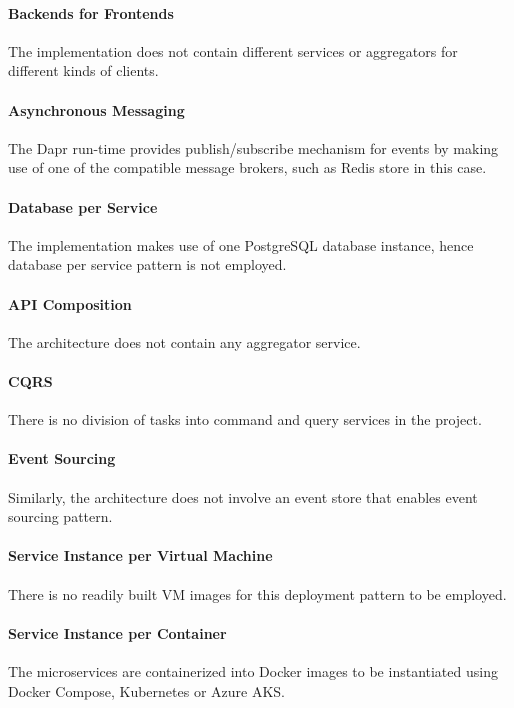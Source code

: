 \documentclass{Configuration_Files/PoliMi3i_thesis}
\begin{document}
\paragraph{Backends for Frontends} The implementation does not contain different services or aggregators for different kinds of clients.

\paragraph{Asynchronous Messaging} The Dapr run-time provides publish/subscribe mechanism for events by making use of one of the compatible message brokers, such as Redis store in this case.

\paragraph{Database per Service} The implementation makes use of one PostgreSQL database instance, hence database per service pattern is not employed.

\paragraph{API Composition} The architecture does not contain any aggregator service.

\paragraph{CQRS} There is no division of tasks into command and query services in the project.

\paragraph{Event Sourcing} Similarly, the architecture does not involve an event store that enables event sourcing pattern.

\paragraph{Service Instance per Virtual Machine} There is no readily built VM images for this deployment pattern to be employed.

\paragraph{Service Instance per Container} The microservices are containerized into Docker images to be instantiated using Docker Compose, Kubernetes or Azure AKS.
\end{document}
